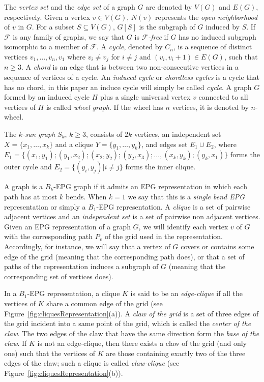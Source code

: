 \documentclass{dmgt}
\begin{document}
The \textit{vertex set} and the \textit{edge set} of a graph $G$ are denoted by $V(G)$ and $E(G)$, respectively.  Given a vertex $v\in V(G)$,  $N(v)$  represents the \textit{open
 neighborhood} of $v$ in $G$. 
For a subset $S \subseteq V(G)$,  $G[S]$ is the subgraph of $G$ induced by $S$.
 If $\mathcal{F}$ is any family of graphs, we say that  $G$ is  \textit{$\mathcal{F}$-free} if $G$ has no induced subgraph isomorphic to a member of $\mathcal{F}$.
 A \textit{cycle},  denoted by $C_n$,  is a sequence of distinct
vertices $v_1, \dots , v_n, v_1$  where $v_i \neq v_j$ for $i \neq j$ and $(v_i, v_i + 1) \in E(G)$, such that
$n \geq 3$. A \textit{chord} is an edge that is between two non-consecutive vertices in a sequence of vertices of a cycle. An \textit{induced cycle}  or \textit{chordless cycles} is a cycle that has no chord, in this paper an induce cycle will simply be called  \textit{cycle}. A graph $G$ formed by an induced cycle $H$ plus  a single universal vertex $v$ connected to all vertices of $H$
is called \textit{wheel graph}. If the wheel has $n$ vertices, it is denoted by $n$-wheel. 

The $k$\textit{-sun graph }$S_k$, $k \geq 3$, consists of
$2k$ vertices, an independent set $X = \{x_1, \dots, x_k\}$ and a clique $Y = \{y_1, \dots, y_k\}$, and edges set $E_1 \cup E_2$, where $E_ 1=\{ (x_1,y_1); (y_1, x_2); (x_2, y_2); (y_2, x_3); \dots , (x_k, y_k); (y_k, x_1) \}$ forms the outer cycle and $E_2= \{(y_i, y_j) |i\neq j\}$ forms the inner clique.

A graph is a $ B_k$-EPG graph if it admits an EPG representation in which each path has at most $k$ bends.  When $ k = 1 $ we say that this is a \emph{single bend EPG} representation or simply a $B_1$-EPG representation.
A \textit{clique} is a set of pairwise adjacent vertices and
an \textit{independent set} is a set of pairwise non adjacent vertices.
Given an EPG representation of a graph $G$, we will identify each vertex $v$ of $G$ with the corresponding path $P_{v}$ of the grid used in the representation. Accordingly, for instance, we will say that a vertex of $G$ covers or contains some edge of the grid (meaning that the corresponding path does), or that a set of paths of the representation
induces a subgraph of $G$ (meaning that the corresponding set of vertices does). 

In  a $B_1$-EPG representation, a clique $K$  is said to be
 an \textit{edge-clique} if all  the vertices of $K$ share a common edge of the grid (see Figure~\ref{fig:cliquesRepresentation}(a)).
 A \textit{claw of the grid} is a set of three edges of the grid incident into a same point of the grid, which is called
  the \textit{center of the claw}. The two edges of the claw that have the same direction form
    the \textit{ base of the claw}. If $K$ is not an edge-clique, then there exists
    a claw of the grid (and only one) such that  the vertices of $K$ are those containing exactly two of the three edges of the claw; such a  clique is called  \textit{claw-clique} \cite{golumbic2009} (see Figure~\ref{fig:cliquesRepresentation}(b)).
\end{document}
